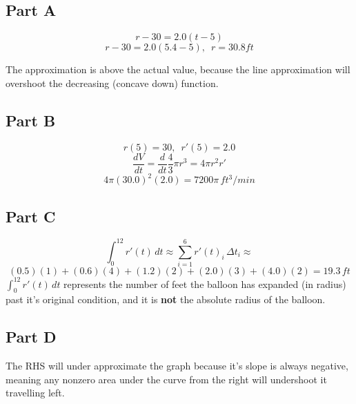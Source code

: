 \subsection{Part A}
\[ r - 30 = 2.0(t - 5) \]
\[ r - 30 = 2.0(5.4 - 5), \enspace r = 30.8 ft \]
\begin{center}
\end{center}
The approximation is above the actual value, because the line approximation will overshoot the decreasing (concave down) function.

\subsection{Part B}
\[ r(5) = 30, \enspace r'(5) = 2.0 \]
\[ \frac{dV}{dt} = \frac{d}{dt} \frac{4}{3}\pi r^3 = 4 \pi r^2 r' \]
\[ 4 \pi (30.0)^2(2.0) = 7200\pi \, ft^3/min \]

\subsection{Part C}
\[ \int_{0}^{12} r'(t)\,dt \approx \sum _{i=1}^{6}r'(t)_{i}\,\Delta t_{i} \approx \]
\[ (0.5)(1) + (0.6)(4) + (1.2)(2) + (2.0)(3) + (4.0)(2) = 19.3 \, ft\]
\underline{$\int_{0}^{12} r'(t)\,dt$} represents the number of feet the balloon has expanded (in radius) past it's original condition, and it is \textbf{not} the absolute radius of the balloon.

\subsection{Part D}
\begin{center}
\end{center}

The RHS will under approximate the graph because it's slope is always negative, meaning any nonzero area under the curve from the right will undershoot it travelling left.
